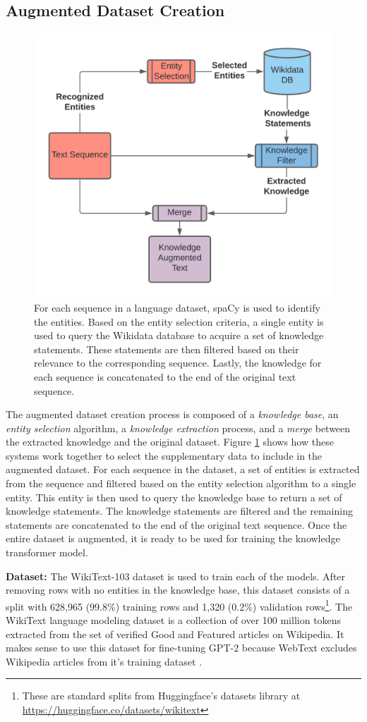 \documentclass[phd,electronic,oneside,twosidetoc,letterpaper,chaptercenter,parttop,lof]{byumsphd}
\begin{document}
\subsection{Augmented Dataset Creation}
    
\begin{figure}
\includegraphics[width=0.5\columnwidth]{images/ssm/augmented_dataset_creation.png}
\centering
\caption[Augmented dataset creation]{
    For each sequence in a language dataset, spaCy is used to identify the entities.
    Based on the entity selection criteria, a single entity is used to query the Wikidata database to acquire a set of knowledge statements.
    These statements are then filtered based on their relevance to the corresponding sequence.
    Lastly, the knowledge for each sequence is concatenated to the end of the original text sequence. 
}
\label{fig:augmented_dataset_creation}
\end{figure}

The augmented dataset creation process is composed of a \emph{knowledge base}, an \emph{entity selection} algorithm, a \emph{knowledge extraction} process, and a \emph{merge} between the extracted knowledge and the original dataset.
Figure \ref{fig:augmented_dataset_creation} shows how these systems work together to select the supplementary data to include in the augmented dataset. 
For each sequence in the dataset, a set of entities is extracted from the sequence and filtered based on the entity selection algorithm to a single entity.
This entity is then used to query the knowledge base to return a set of knowledge statements.
The knowledge statements are filtered and the remaining statements are concatenated to the end of the original text sequence.
Once the entire dataset is augmented, it is ready to be used for training the knowledge transformer model.

\textbf{Dataset:}
The WikiText-103 dataset \cite{merity2016pointer} is used to train each of the models. 
After removing rows with no entities in the knowledge base, this dataset consists of a split with 628,965 (99.8\%) training rows and 1,320 (0.2\%) validation rows\footnote{These are standard splits from Huggingface's datasets library at \url{https://huggingface.co/datasets/wikitext}}. 
The WikiText language modeling dataset is a collection of over 100 million tokens extracted from the set of verified Good and Featured articles on Wikipedia. 
It makes sense to use this dataset for fine-tuning GPT-2 because WebText excludes Wikipedia articles from it's training dataset \cite{radford2019language}.
\end{document}
